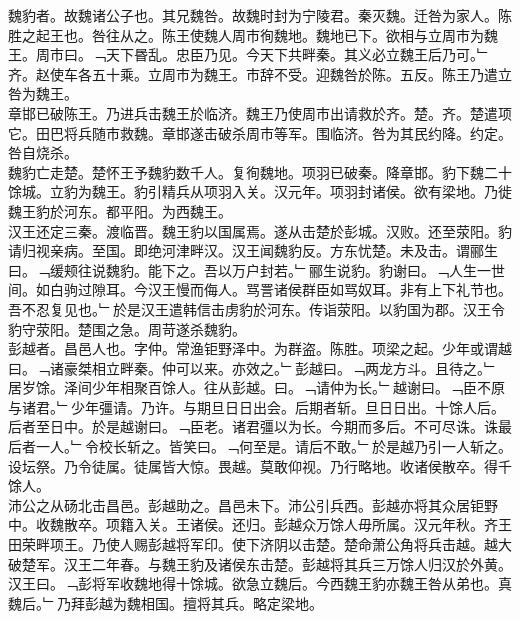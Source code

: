 \documentclass{zhvt-classic}
\begin{document}

\hspace*{2em}魏豹者。故魏诸公子也。其兄魏咎。故魏时封为宁陵君。秦灭魏。迁咎为家人。陈胜之起王也。咎往从之。陈王使魏人周市徇魏地。魏地已下。欲相与立周市为魏王。周市曰。﹁天下昬乱。忠臣乃见。今天下共畔秦。其义必立魏王后乃可。﹂齐。赵使车各五十乘。立周市为魏王。市辞不受。迎魏咎於陈。五反。陈王乃遣立咎为魏王。\\
\hspace*{2em}章邯已破陈王。乃进兵击魏王於临济。魏王乃使周市出请救於齐。楚。齐。楚遣项它。田巴将兵随市救魏。章邯遂击破杀周市等军。围临济。咎为其民约降。约定。咎自烧杀。\\
\hspace*{2em}魏豹亡走楚。楚怀王予魏豹数千人。复徇魏地。项羽已破秦。降章邯。豹下魏二十馀城。立豹为魏王。豹引精兵从项羽入关。汉元年。项羽封诸侯。欲有梁地。乃徙魏王豹於河东。都平阳。为西魏王。\\
\hspace*{2em}汉王还定三秦。渡临晋。魏王豹以国属焉。遂从击楚於彭城。汉败。还至荥阳。豹请归视亲病。至国。即绝河津畔汉。汉王闻魏豹反。方东忧楚。未及击。谓郦生曰。﹁缓颊往说魏豹。能下之。吾以万户封若。﹂郦生说豹。豹谢曰。﹁人生一世间。如白驹过隙耳。今汉王慢而侮人。骂詈诸侯群臣如骂奴耳。非有上下礼节也。吾不忍复见也。﹂於是汉王遣韩信击虏豹於河东。传诣荥阳。以豹国为郡。汉王令豹守荥阳。楚围之急。周苛遂杀魏豹。\\
\hspace*{2em}彭越者。昌邑人也。字仲。常渔钜野泽中。为群盗。陈胜。项梁之起。少年或谓越曰。﹁诸豪桀相立畔秦。仲可以来。亦效之。﹂彭越曰。﹁两龙方斗。且待之。﹂\\
\hspace*{2em}居岁馀。泽间少年相聚百馀人。往从彭越。曰。﹁请仲为长。﹂越谢曰。﹁臣不原与诸君。﹂少年彊请。乃许。与期旦日日出会。后期者斩。旦日日出。十馀人后。后者至日中。於是越谢曰。﹁臣老。诸君彊以为长。今期而多后。不可尽诛。诛最后者一人。﹂令校长斩之。皆笑曰。﹁何至是。请后不敢。﹂於是越乃引一人斩之。设坛祭。乃令徒属。徒属皆大惊。畏越。莫敢仰视。乃行略地。收诸侯散卒。得千馀人。\\
\hspace*{2em}沛公之从砀北击昌邑。彭越助之。昌邑未下。沛公引兵西。彭越亦将其众居钜野中。收魏散卒。项籍入关。王诸侯。还归。彭越众万馀人毋所属。汉元年秋。齐王田荣畔项王。乃使人赐彭越将军印。使下济阴以击楚。楚命萧公角将兵击越。越大破楚军。汉王二年春。与魏王豹及诸侯东击楚。彭越将其兵三万馀人归汉於外黄。汉王曰。﹁彭将军收魏地得十馀城。欲急立魏后。今西魏王豹亦魏王咎从弟也。真魏后。﹂乃拜彭越为魏相国。擅将其兵。略定梁地。\\
\end{document}
